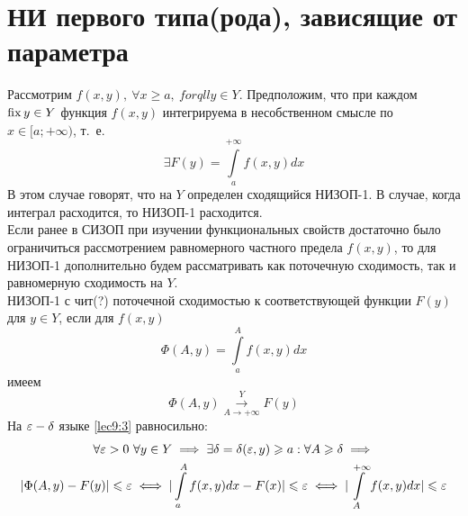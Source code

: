 \documentclass[../../main.tex]{subfiles}
\begin{document}
\section{НИ первого типа(рода), зависящие от параметра}

Рассмотрим $ f(x, y),\ \forall x \geq a,\ forqll y \in Y $.
Предположим, что при каждом $ \operatorname{fix} y \in Y $ функция $ f(x, y) $
интегрируема в несобственном смысле по $ x \in [a; +\infty) $, т.~е.
\begin{equation}
\label{lec9:1}
\exists F(y) = \int\limits_a^{+\infty} f(x, y) dx
\end{equation}
В этом случае говорят, что на $ Y $ определен сходящийся НИЗОП-1.
В случае, когда интеграл расходится, то НИЗОП-1 расходится.\\
Если ранее в СИЗОП при изучении функциональных свойств достаточно
было ограничиться рассмотрением равномерного частного предела $ f(x, y) $,
то для НИЗОП-1 дополнительно будем рассматривать как поточечную сходимость,
так и равномерную сходимость на $ Y $.\\
НИЗОП-1 с чит(?) поточечной сходимостью к соответствующей функции $ F(y) $
для $ y \in Y $, если для $ f(x, y) $ 
\begin{equation}
\label{lec9:2}
\Phi(A, y) = \int\limits_a^A f(x, y) dx
\end{equation}
имеем
\begin{equation}
\label{lec9:3}
\Phi(A, y) \stackrel{Y}{\underset{A \to +\infty}{\to}} F(y)
\end{equation}
На $ \varepsilon-\delta $ языке \eqref{lec9:3} равносильно:
\begin{equation}
\label{lec9:4}
\begin{gathered}
\forall \varepsilon > 0\ \forall y \in Y \implies \exists \delta = \delta(\varepsilon, y)
\geqslant a:\forall A \geqslant \delta \implies\\ 
|\Phi(A, y) - F(y)| \leqslant \varepsilon \iff
|\int\limits_a^A f(x, y) dx - F(x)| \leqslant \varepsilon \iff
|\int\limits_A^{+\infty} f(x, y) dx| \leqslant \varepsilon
\end{gathered}
\end{equation}
\end{document}
